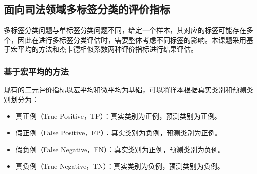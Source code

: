 

\subsection{面向司法领域多标签分类的评价指标}
多标签分类问题与单标签分类问题不同，给定一个样本，其对应的标签可能存在多个，因此在进行多标签分类评估时，需要整体考虑不同标签的影响。本课题采用基于宏平均的方法和杰卡德相似系数两种评价指标进行结果评估。
\subsubsection{基于宏平均的方法}
现有的二元评价指标以宏平均和微平均为基础，可以将样本根据真实类别和预测类别划分为：
\begin{itemize}
    \item 真正例（True Positive，TP）：真实类别为正例，预测类别为正例。
    \item 假正例（False Positive，FP）：真实类别为负例，预测类别为正例。
    \item 假负例（False Negative，FN）：真实类别为正例，预测类别为负例。
    \item 真负例（True Negative，TN）：真实类别为负例，预测类别为负例。
\end{itemize}

